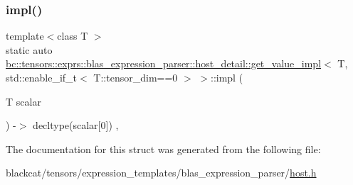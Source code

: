 \subsubsection{\texorpdfstring{impl()}{impl()}}
{\footnotesize\ttfamily template$<$class T $>$ \\
static auto \hyperlink{structbc_1_1tensors_1_1exprs_1_1blas__expression__parser_1_1host__detail_1_1get__value__impl}{bc\+::tensors\+::exprs\+::blas\+\_\+expression\+\_\+parser\+::host\+\_\+detail\+::get\+\_\+value\+\_\+impl}$<$ T, std\+::enable\+\_\+if\+\_\+t$<$ T\+::tensor\+\_\+dim==0 $>$ $>$\+::impl (\begin{DoxyParamCaption}\item[{T}]{scalar }\end{DoxyParamCaption}) -\/$>$ decltype(scalar\mbox{[}0\mbox{]}) \hspace{0.3cm}{\ttfamily [inline]}, {\ttfamily [static]}}



The documentation for this struct was generated from the following file\+:\begin{DoxyCompactItemize}
\item 
blackcat/tensors/expression\+\_\+templates/blas\+\_\+expression\+\_\+parser/\hyperlink{tensors_2expression__templates_2blas__expression__parser_2host_8h}{host.\+h}\end{DoxyCompactItemize}
